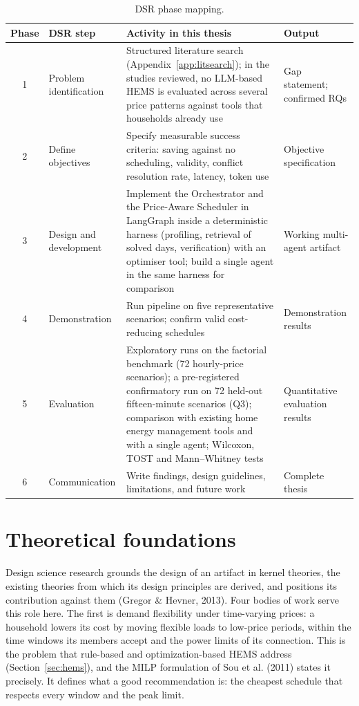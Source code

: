 \documentclass[12pt,a4paper]{report}
\begin{document}
\begin{table}[h!]
\caption{DSR phase mapping.}
\label{tab:dsr}
\small
\begin{tabularx}{\textwidth}{c>{\raggedright\arraybackslash}p{2.6cm}%
  >{\raggedright\arraybackslash}X>{\raggedright\arraybackslash}p{3.2cm}}
\toprule
Phase & DSR step & Activity in this thesis & Output \\
\midrule
1 & Problem identification &
  Structured literature search (Appendix~\ref{app:litsearch}); in the
  studies reviewed, no LLM-based HEMS is evaluated across several price
  patterns against tools that households already use &
  Gap statement; confirmed RQs \\[4pt]
2 & Define objectives &
  Specify measurable success criteria: saving against no scheduling,
  validity, conflict resolution rate, latency, token use &
  Objective specification \\[4pt]
3 & Design and development &
  Implement the Orchestrator and the Price-Aware Scheduler in
  LangGraph inside a deterministic harness (profiling, retrieval of
  solved days, verification) with an optimiser tool; build a single
  agent in the same harness for comparison &
  Working multi-agent artifact \\[4pt]
4 & Demonstration &
  Run pipeline on five representative scenarios; confirm valid
  cost-reducing schedules &
  Demonstration results \\[4pt]
5 & Evaluation &
  Exploratory runs on the factorial benchmark (72 hourly-price
  scenarios); a pre-registered confirmatory run on 72 held-out
  fifteen-minute scenarios (Q3); comparison with existing home energy
  management tools and with a single agent; Wilcoxon, TOST and
  Mann--Whitney tests &
  Quantitative evaluation results \\[4pt]
6 & Communication &
  Write findings, design guidelines, limitations, and future work &
  Complete thesis \\
\bottomrule
\end{tabularx}
\end{table}

\section{Theoretical foundations}
\label{sec:theory}

Design science research grounds the design of an artifact in kernel
theories, the existing theories from which its design principles are
derived, and positions its contribution against them (Gregor \& Hevner,
2013). Four bodies of work serve this role here. The first is demand
flexibility under time-varying prices: a household lowers its cost by
moving flexible loads to low-price periods, within the time windows its
members accept and the power limits of its connection. This is the
problem that rule-based and optimization-based HEMS address
(Section~\ref{sec:hems}), and the MILP formulation of Sou et al. (2011)
states it precisely. It defines what a good recommendation is: the
cheapest schedule that respects every window and the peak limit.
\end{document}
